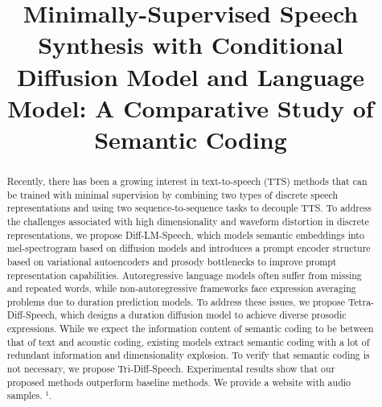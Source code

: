 \documentclass{article}
\title{Minimally-Supervised Speech Synthesis with Conditional Diffusion Model and Language Model: A Comparative Study of Semantic Coding}
\begin{document}
%
\maketitle
%


\begin{abstract}
  Recently, there has been a growing interest in text-to-speech (TTS) methods that can be trained with minimal supervision by combining two types of discrete speech representations and using two sequence-to-sequence tasks to decouple TTS. To address the challenges associated with high dimensionality and waveform distortion in discrete representations, we propose Diff-LM-Speech, which models semantic embeddings into mel-spectrogram based on diffusion models and introduces a prompt encoder structure based on variational autoencoders and prosody bottlenecks to improve prompt representation capabilities. Autoregressive language models often suffer from missing and repeated words, while non-autoregressive frameworks face expression averaging problems due to duration prediction models. To address these issues, we propose Tetra-Diff-Speech, which designs a duration diffusion model to achieve diverse prosodic expressions. While we expect the information content of semantic coding to be between that of text and acoustic coding, existing models extract semantic coding with a lot of redundant information and dimensionality explosion. To verify that semantic coding is not necessary, we propose Tri-Diff-Speech. Experimental results show that our proposed methods outperform baseline methods. We provide a website with audio samples. \href{https://qiangchunyu.github.io/Diff-LM-Speech/diff_speech.html}{$^1$}.

\end{abstract}
\end{document}
